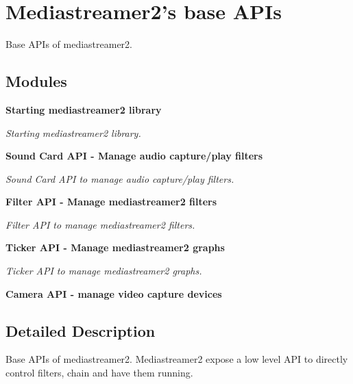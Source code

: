 \section{Mediastreamer2's base A\-P\-Is}
\label{group__mediastreamer2__api}


Base A\-P\-Is of mediastreamer2.  


\subsection*{Modules}
\begin{DoxyCompactItemize}
\item 
{\bf Starting mediastreamer2 library}
\begin{DoxyCompactList}\small\item\em Starting mediastreamer2 library. \end{DoxyCompactList}\item 
{\bf Sound Card A\-P\-I -\/ Manage audio capture/play filters}
\begin{DoxyCompactList}\small\item\em Sound Card A\-P\-I to manage audio capture/play filters. \end{DoxyCompactList}\item 
{\bf Filter A\-P\-I -\/ Manage mediastreamer2 filters}
\begin{DoxyCompactList}\small\item\em Filter A\-P\-I to manage mediastreamer2 filters. \end{DoxyCompactList}\item 
{\bf Ticker A\-P\-I -\/ Manage mediastreamer2 graphs}
\begin{DoxyCompactList}\small\item\em Ticker A\-P\-I to manage mediastreamer2 graphs. \end{DoxyCompactList}\item 
{\bf Camera A\-P\-I -\/ manage video capture devices}
\end{DoxyCompactItemize}


\subsection{Detailed Description}
Base A\-P\-Is of mediastreamer2. Mediastreamer2 expose a low level A\-P\-I to directly control filters, chain and have them running. 
